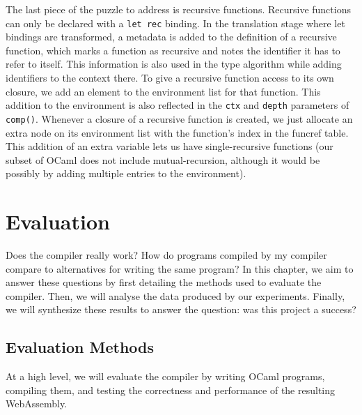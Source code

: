 \documentclass[12pt,a4paper,twoside,openright]{report}
\begin{document}
The last piece of the puzzle to address is recursive functions.
Recursive functions can only be declared with a {\tt let rec} binding.
In the translation stage where let bindings are transformed, a metadata is added to the definition of a recursive function, which marks a function as recursive and notes the identifier it has to refer to itself.
This information is also used in the type algorithm while adding identifiers to the context there.
To give a recursive function access to its own closure, we add an element to the environment list for that function.
This addition to the environment is also reflected in the {\tt ctx} and {\tt depth} parameters of {\tt comp()}.
Whenever a closure of a recursive function is created, we just allocate an extra node on its environment list with the function's index in the funcref table.
This addition of an extra variable lets us have single-recursive functions (our subset of OCaml does not include mutual-recursion, although it would be possibly by adding multiple entries to the environment).

\chapter{Evaluation}

Does the compiler really work?
How do programs compiled by my compiler compare to alternatives for writing the same program?
In this chapter, we aim to answer these questions by first detailing the methods used to evaluate the compiler.
Then, we will analyse the data produced by our experiments.
Finally, we will synthesize these results to answer the question: was this project a success?

\section{Evaluation Methods}
At a high level, we will evaluate the compiler by writing OCaml programs, compiling them, and testing the  correctness and performance of the resulting WebAssembly.
\end{document}

